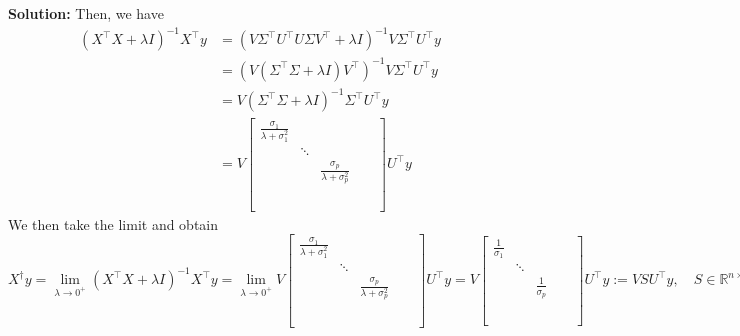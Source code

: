 \documentclass[11pt]{article}
\theoremstyle{plain} %
\newenvironment{solution}
{\color{C2}\normalfont\begin{framed}\begingroup\textbf{Solution:} }
  {\endgroup\end{framed}}
\theoremstyle{remark}
\begin{document}
\begin{solution}
    Then, we have \begin{align*}
    \left(X^\top X+\lambda I\right)^{-1} X^\top y &= \left(V\Sigma^\top U^\top U \Sigma V^\top +\lambda I\right)^{-1} V\Sigma^\top U^\top y\\
    &= \left(V \left(\Sigma^\top \Sigma +\lambda I \right) V^\top \right)^{-1} V\Sigma^\top U^\top y\\
    &= V \left(\Sigma^\top \Sigma +\lambda I \right)^{-1}\Sigma^\top U^\top y\\
    &=V \begin{bmatrix}
        \frac{\sigma_1}{\lambda + \sigma_1^2} & & & &\\
        & \ddots &  &  &\\
         & & \frac{\sigma_p}{\lambda + \sigma_p^2} & &\\
         & &  & &\\
         &  &  &  &\\
         &  &  &  &\\
    \end{bmatrix} U^\top y 
    \end{align*}
    We then take the limit and obtain
    $$
    X^\dagger y = \lim _{\lambda \rightarrow 0^{+}}\left(X^\top X+\lambda I\right)^{-1} X^\top y = \lim _{\lambda \rightarrow 0^{+}} V \begin{bmatrix}
        \frac{\sigma_1}{\lambda + \sigma_1^2} & & & &\\
        & \ddots &  &  &\\
         & & \frac{\sigma_p}{\lambda + \sigma_p^2} & &\\
         & &  & &\\
         &  &  &  &\\
         &  &  &  &\\
    \end{bmatrix} U^\top y = V \begin{bmatrix}
        \frac{1}{\sigma_1} & & & &\\
        & \ddots &  &  &\\
         & & \frac{1}{\sigma_p} & &\\
         & &  & &\\
         &  &  &  &\\
         &  &  &  &\\
    \end{bmatrix} U^\top y := V S U^\top y, \quad S \in \mathbb{R}^{n\times m}
    $$


\end{solution}
\end{document}
